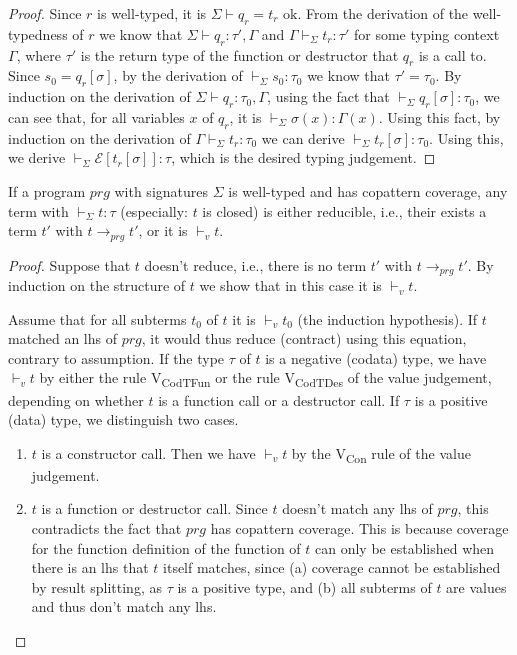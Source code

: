 \begin{lemma}
\begin{proof}
Since $r$ is well-typed, it is $\Sigma \vdash q_r = t_r \textrm{ ok}$. From the derivation of the well-typedness of $r$ we know that $\Sigma \vdash q_r : \tau', \Gamma$ and $\Gamma \vdash_{\Sigma} t_r : \tau'$ for some typing context $\Gamma$, where $\tau'$ is the return type of the function or destructor that $q_r$ is a call to. Since $s_0 = q_r[\sigma]$, by the derivation of $\vdash_{\Sigma} s_0 : \tau_0$ we know that $\tau' = \tau_0$. By induction on the derivation of $\Sigma \vdash q_r : \tau_0, \Gamma$, using the fact that $\vdash_{\Sigma} q_r[\sigma] : \tau_0$, we can see that, for all variables $x$ of $q_r$, it is $\vdash_{\Sigma} \sigma(x) : \Gamma(x)$. Using this fact, by induction on the derivation of $\Gamma \vdash_{\Sigma} t_r : \tau_0$ we can derive $\vdash_{\Sigma} t_r[\sigma] : \tau_0$. Using this, we derive $\vdash_{\Sigma} \mathcal{E}[t_r[\sigma]] : \tau$, which is the desired typing judgement.
\end{proof}
\end{lemma}

\begin{lemma}[Progress]
If a program $prg$ with signatures $\Sigma$ is well-typed and has copattern coverage, any term with $\vdash_{\Sigma} t : \tau$ (especially: $t$ is closed) is either reducible, i.e., their exists a term $t'$ with $t \longrightarrow_{prg} t'$, or it is $\vdash_v t$.
\begin{proof}
Suppose that $t$ doesn't reduce, i.e., there is no term $t'$ with $t \longrightarrow_{prg} t'$. By induction on the structure of $t$ we show that in this case it is $\vdash_v t$.

Assume that for all subterms $t_0$ of $t$ it is $\vdash_v t_0$ (the induction hypothesis). If $t$ matched an lhs of $prg$, it would thus reduce (contract) using this equation, contrary to assumption. If the type $\tau$ of $t$ is a negative (codata) type, we have $\vdash_v t$ by either the rule V\textsubscript{CodTFun} or the rule V\textsubscript{CodTDes} of the value judgement, depending on whether $t$ is a function call or a destructor call. If $\tau$ is a positive (data) type, we distinguish two cases.
\begin{enumerate}
\item $t$ is a constructor call. Then we have $\vdash_v t$ by the V\textsubscript{Con} rule of the value judgement.

\item $t$ is a function or destructor call. Since $t$ doesn't match any lhs of $prg$, this contradicts the fact that $prg$ has copattern coverage. This is because coverage for the function definition of the function of $t$ can only be established when there is an lhs that $t$ itself matches, since (a) coverage cannot be established by result splitting, as $\tau$ is a positive type, and (b) all subterms of $t$ are values and thus don't match any lhs.
\end{enumerate}
\end{proof}
\end{lemma}

